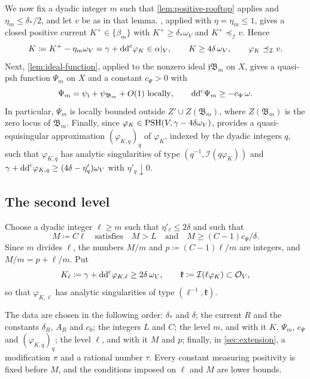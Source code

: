 \documentclass[11pt,a4paper]{amsart}
\newcommand{\lessI}{\preceq_{\mathcal I}}
\theoremstyle{definition}
\begin{document}
We now fix a dyadic integer $m$ such that \cref{lem:positive-rooftop}
applies and $\eta_m\le\delta_*/2$, and let $v$ be as in that lemma.
, applied with $\eta=\eta_m\le1$, gives a closed
positive current $K^+\in\{\beta_m\}$ with $K^+\ge\delta_*\omega_V$ and
$K^+\lessI v$. Hence
\begin{equation}\label{eq:def-K}
  K\coloneqq K^+-\eta_m\omega_V=\gamma+\ddc\varphi_K\in\alpha|_V,\qquad
  K\ge4\delta\,\omega_V,\qquad
  \varphi_K\lessI v .
\end{equation}
Next, \cref{lem:ideal-function}, applied to the nonzero ideal
$\mathfrak j\mathfrak B_m$ on $X$, gives a quasi-psh function $\Psi_m$ on
$X$ and a constant $c_\Psi>0$ with
\begin{equation}\label{eq:def-Psi}
  \Psi_m=\psi_{\mathfrak j}+\psi_{\mathfrak B_m}+O(1)\ \text{locally},
  \qquad
  \mathrm{dd}^{\mathrm{c}}\Psi_m\ge-c_\Psi\,\omega .
\end{equation}
In particular, $\Psi_m$ is locally bounded outside
$Z'\cup Z(\mathfrak B_m)$, where $Z(\mathfrak B_m)$ is the zero locus of
$\mathfrak B_m$. Finally, since
$\varphi_K\in\mathrm{PSH}(V,\gamma-4\delta\omega_V)$, \cite[Theorem~1.6.2]{XiaSGPT}
provides a quasi-equisingular approximation $(\varphi_{K,q})_q$ of
$\varphi_K$, indexed by the dyadic integers $q$, such that
$\varphi_{K,q}$ has analytic singularities of type
$(q^{-1},\mathcal I(q\varphi_K))$ and
$\gamma+\mathrm{dd}^{\mathrm{c}}\varphi_{K,q}\ge(4\delta-\eta'_q)\omega_V$ with
$\eta'_q\downarrow0$.

\subsection{The second level}

Choose a dyadic integer $\ell\ge m$ such that $\eta'_\ell\le2\delta$ and
such that
\begin{equation}\label{eq:choice-M}
  M\coloneqq C\ell\quad\text{satisfies}\quad
  M>L\quad\text{and}\quad M\ge(C-1)c_\Psi/\delta .
\end{equation}
Since $m$ divides $\ell$, the numbers $M/m$ and $p\coloneqq (C-1)\ell/m$
are integers, and $M/m=p+\ell/m$. Put
\begin{equation}\label{eq:def-K-ell}
  K_\ell\coloneqq \gamma+\mathrm{dd}^{\mathrm{c}}\varphi_{K,\ell}\ge2\delta\,\omega_V,
  \qquad
  \mathfrak k\coloneqq \mathcal I(\ell\varphi_K)\subset\mathcal O_V ,
\end{equation}
so that $\varphi_{K,\ell}$ has analytic singularities of type
$(\ell^{-1},\mathfrak k)$.

\begin{remark}\label{rem:order}
The data are chosen in the following order: $\delta_*$ and $\delta$; the
current $R$ and the constants $\delta_R$, $A_R$ and $c_0$; the integers $L$
and $C$; the level $m$, and with it $K$, $\Psi_m$, $c_\Psi$ and
$(\varphi_{K,q})_q$; the level $\ell$, and with it $M$ and $p$; finally,
in \cref{sec:extension}, a modification $\pi$ and a rational number
$\tau$. Every constant measuring positivity is fixed before $M$, and the
conditions imposed on $\ell$ and $M$ are lower bounds.
\end{remark}
\end{document}
